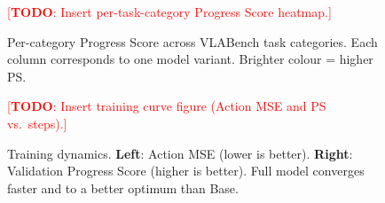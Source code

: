\documentclass[10pt,twocolumn]{article}
\newcommand{\TODO}[1]{\textcolor{red}{[\textbf{TODO}: #1]}}
\begin{document}
\begin{table}[t]
  \centering
  \caption{Main results on VLABench. We report Progress Score (PS) and
    Success Rate (SR) on Primitive (Prim.) and Composite (Comp.) splits,
    as well as the overall average. \TODO{Fill in all numbers after experiments.}}
  \label{tab:main}
\end{table}

\begin{figure}[t]
  \centering
  \TODO{Insert per-task-category Progress Score heatmap.}
  \caption{Per-category Progress Score across VLABench task categories.
    Each column corresponds to one model variant.
    Brighter colour = higher PS.}
  \label{fig:heatmap}
\end{figure}

\begin{figure}[t]
  \centering
  \TODO{Insert training curve figure (Action MSE and PS vs.\ steps).}
  \caption{Training dynamics. \textbf{Left}: Action MSE (lower is better).
    \textbf{Right}: Validation Progress Score (higher is better).
    Full model converges faster and to a better optimum than Base.}
  \label{fig:training_curve}
\end{figure}
\end{document}
